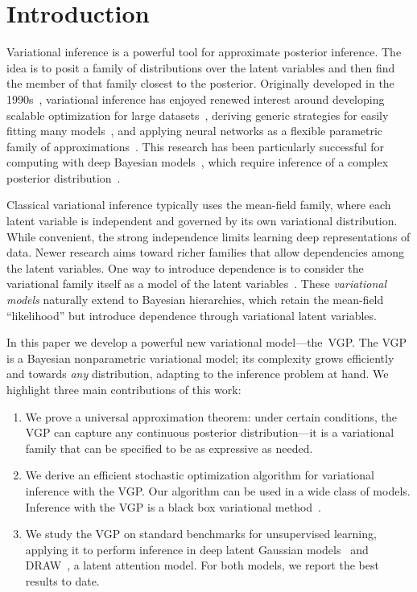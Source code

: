 
\section{Introduction}

Variational inference is a powerful tool for approximate posterior
inference. The idea is to posit a family of distributions over the
latent variables and then find the member of that family closest to
the posterior.  Originally developed in the
1990s~\citep{hinton1993keeping,waterhouse1996bayesian,jordan1999introduction},
variational inference has enjoyed renewed interest around developing
scalable optimization for large datasets~\citep{hoffman2013stochastic},
deriving generic strategies for easily fitting many
models~\citep{ranganath2014black},
and applying neural networks as a flexible parametric family of
approximations~\citep{kingma2014autoencoding,rezende2014stochastic}.  This research has been particularly
successful for computing with deep Bayesian
models~\citep{neal1990learning,ranganath2015deep}, which
require inference of a complex posterior distribution~\citep{hinton2006fast}.

Classical variational inference typically uses the mean-field family,
where each latent variable is independent and governed by its own
variational distribution. While convenient, the
strong independence limits learning
deep representations of data. Newer research aims
toward richer families that allow dependencies among the latent variables.  One way to introduce dependence is to consider the
variational family itself as a model of the latent
variables~\citep{lawrence2000variational,ranganath2015hierarchical}. These
\textit{variational models} naturally extend to Bayesian hierarchies,
which retain the mean-field ``likelihood'' but introduce dependence
through variational latent variables.

In this paper we develop a powerful new variational
model---the~\gls{VGP}. The \gls{VGP} is a Bayesian
nonparametric variational model; its complexity grows efficiently and
towards \textit{any} distribution, adapting to the inference problem
at hand.
We highlight three main contributions of this work:
\begin{enumerate}
\item We prove a universal approximation theorem: under certain
  conditions, the \gls{VGP} can capture any continuous posterior
  distribution---it is a variational family that can be specified
  to be as expressive as needed.

\item We derive an efficient stochastic optimization algorithm for
  variational inference with the \gls{VGP}.  Our algorithm can be used in a wide class of
  models.  Inference with the \gls{VGP} is a black box variational
  method~\citep{ranganath2014black}.

\item We study the \gls{VGP} on standard benchmarks for unsupervised
  learning, applying it to perform inference in deep latent
  Gaussian models~\citep{rezende2014stochastic} and
  DRAW~\citep{gregor2015draw}, a latent attention model. For both models, we report
  the best results to date.
\end{enumerate}

